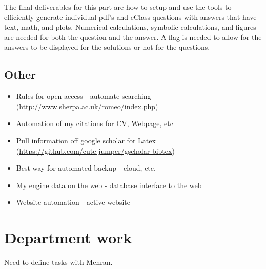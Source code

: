 \documentclass[12pt]{article}
\begin{document}
The final deliverables for this part are how to setup and use the tools to efficiently generate individual pdf's and eClass questions with answers that have text, math, and plots. Numerical calculations, symbolic calculations, and figures are needed for both the question and the answer. A flag is needed to allow for the answers to be displayed for the solutions or not for the questions.


\subsection{Other}

\begin{itemize}
    \item Rules for open access - automate searching\\
    (\url{http://www.sherpa.ac.uk/romeo/index.php})
    \item Automation of my citations for CV, Webpage, etc
    \item Pull information off google scholar for Latex\\
    (\url{https://github.com/cute-jumper/gscholar-bibtex})
    \item Best way for automated backup - cloud, etc.
    \item My engine data on the web - database interface to the web
    \item Website automation - active website
 \end{itemize}

\section{Department work}

Need to define tasks with Mehran.
\end{document}
